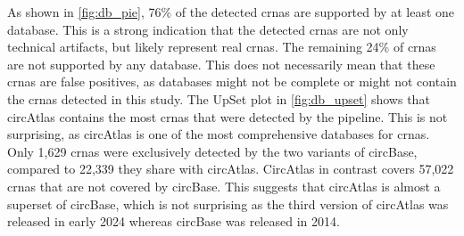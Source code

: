 As shown in \cref{fig:db_pie}, 76\% of the detected \glspl{crna} are supported
by at least one database.
This is a strong indication that the detected \glspl{crna} are not only
technical artifacts, but likely represent real \glspl{crna}.
The remaining 24\% of \glspl{crna} are not supported by any database.
This does not necessarily mean that these \glspl{crna} are false positives, as
databases might not be complete or might not contain the \glspl{crna} detected
in this study.
The UpSet plot in \cref{fig:db_upset} shows that circAtlas contains the most
\glspl{crna} that were detected by the pipeline.
This is not surprising, as circAtlas is one of the most comprehensive databases
for \glspl{crna}.
Only 1,629 \glspl{crna} were exclusively detected by the two variants of
circBase, compared to 22,339 they share with circAtlas.
CircAtlas in contrast covers 57,022 \glspl{crna} that are not covered by
circBase.
This suggests that circAtlas is almost a superset of circBase, which is not
surprising as the third version of circAtlas was released in early 2024 whereas
circBase was released in
2014\supercite{glazar_circbase_2014,wu_circatlas_2023}.
